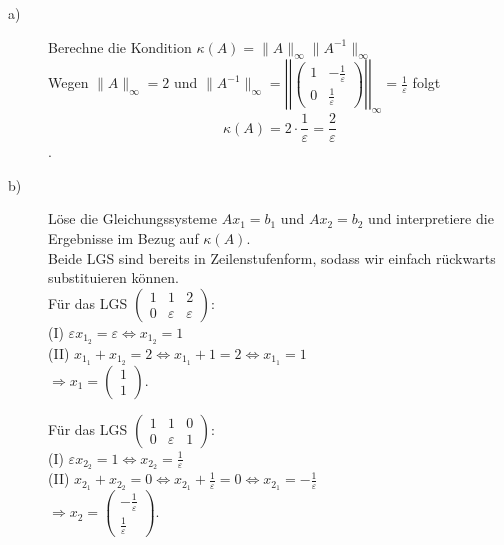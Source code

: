 \documentclass[11pt,a4paper,ngerman]{article}
\begin{document}
\begin{description}
\item[a)] Berechne die Kondition $\kappa(A) = \|A \|_{\infty} \|A^{-1} \|_{\infty} $ \\

Wegen $\|A \|_{\infty} = 2$ und
$\|A^ {-1} \|_{\infty} =
            \left|\left| \left(
                \begin{array}{cc}
                    1 & -\frac{1}{\varepsilon} \\
                    0 & \frac{1}{\varepsilon}
                \end{array}
           \right) \right|\right|_{\infty}
            = \frac{1}{\varepsilon}$
folgt
$$ \kappa(A) = 2 \cdot \frac{1}{\varepsilon} = \frac{2}{\varepsilon}$$.

\item[b)] Löse die Gleichungssysteme $Ax_1 = b_1$ und $Ax_2 = b_2$ und interpretiere die Ergebnisse im Bezug auf $\kappa(A)$. \\

Beide LGS sind bereits in Zeilenstufenform, sodass wir einfach rückwarts substituieren können. \\
Für das LGS $\left(
      \begin{array}{cc|c}
         1 & 1           & 2\\
         0 & \varepsilon & \varepsilon
      \end{array}
    \right)$: \\

(I) $\varepsilon x_{1_2} = \varepsilon \Leftrightarrow x_{1_2} = 1$ \\
(II) $x_{1_1} + x_{1_2} = 2 \Leftrightarrow x_{1_1} + 1 = 2 \Leftrightarrow x_{1_1} = 1$ \\
$ \Rightarrow x_1 = \left(\begin{array}{c} 1 \\ 1 \end{array} \right)$.


Für das LGS $\left(
      \begin{array}{cc|c}
         1 & 1           & 0\\
         0 & \varepsilon & 1
      \end{array}
    \right)$: \\

(I) $\varepsilon x_{2_2} = 1 \Leftrightarrow x_{2_2} = \frac{1}{\varepsilon}$ \\
(II) $x_{2_1} + x_{2_2} = 0 \Leftrightarrow x_{2_1} + \frac{1}{\varepsilon} = 0 \Leftrightarrow x_{2_1} = -\frac{1}{\varepsilon}$ \\
$ \Rightarrow x_2 = \left(\begin{array}{c} -\frac{1}{\varepsilon} \\ \frac{1}{\varepsilon} \end{array} \right)$.


\end{description}
\end{document}
